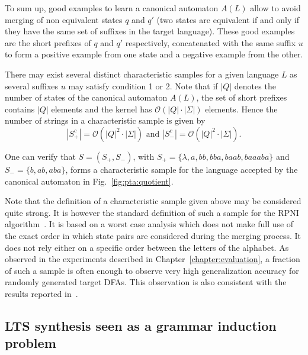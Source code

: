 To sum up, good examples to learn a canonical automaton $A(L)$ allow to avoid merging of non equivalent states $q$ and $q'$ (two states are equivalent if and only if they have the same set of suffixes in the target language). These good examples are the short prefixes of $q$ and $q'$ respectively, concatenated with the same suffix $u$ to form a positive example from one state and a negative example from the other. 

There may exist several distinct characteristic samples for a given language $L$ as several suffixes $u$ may satisfy condition 1 or 2. Note that if $|Q|$ denotes the number of states of the canonical automaton $A(L)$, the set of short prefixes contains $|Q|$ elements and the kernel has $\mathcal{O}(|Q|\cdot |\Sigma |)$ elements. Hence the number of strings in a characteristic sample is given by 
\[
|S_{+}^c|=\mathcal{O}(|Q|^2\cdot |\Sigma |)\mbox{ and }|S_{-}^c|=\mathcal{O}(|Q|^2\cdot |\Sigma |). 
\]

One can verify that $S = (S_+, S_-)$, with $S_+ = \{\lambda, a, bb, bba, baab, baaaba\}$ and $S_- = \{b, ab, aba\}$, forms a characteristic sample for the language accepted by the canonical automaton in Fig.~\ref{fig:pta:quotient}.

Note that the definition of a characteristic sample given above may be considered quite strong. It is however the standard definition of such a sample for the RPNI algorithm~\cite{Oncina:1992,Dupont:1996b}. It is based on a worst case analysis which does not make full use of the exact order in which state pairs are considered during the merging process. It does not rely either on a specific order between the letters of the alphabet. As observed in the experiments described in Chapter~\ref{chapter:evaluation}, a fraction of such a sample is often enough to observe very high generalization accuracy for randomly generated target DFAs. This observation is also consistent with the results reported in~\cite{Lang:1998}.

\subsection{LTS synthesis seen as a grammar induction problem}

